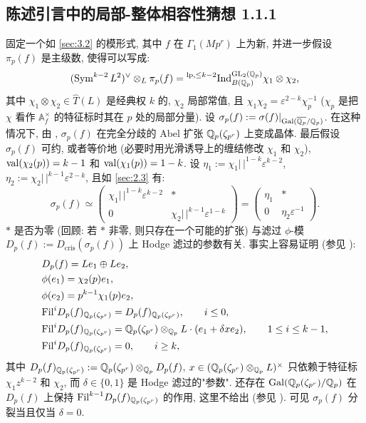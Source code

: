 
\subsection{陈述引言中的局部-整体相容性猜想 1.1.1}\label{sec:3.3}

固定一个如 \ref{sec:3.2} 的模形式, 其中 $f$ 在 $\Gamma_1(Mp^{r})$ 上为新, 并进一步假设 $\pi_p(f)$ 是主级数, 使得可以写成:
\[
(\operatorname{Sym}^{k-2}L^{2})^{\vee} \otimes_L \pi_p(f) = \prescript{\mathrm{lp},\le k-2}{}{\mathrm{Ind}}_{B(\mathbb{Q}_p)}^{\mathrm{GL}_2(\mathbb{Q}_p)} \chi_1 \otimes \chi_2,
\]
其中 $\chi_1 \otimes \chi_2 \in \widehat{T}(L)$ 是经典权 $k$ 的, $\chi_2$ 局部常值, 且 $\chi_1\chi_2 = \varepsilon^{2-k}\chi_p^{-1}$ ($\chi_p$ 是把 $\chi$ 看作 $\mathbb{A}_{f}^{\times}$ 的特征标时其在 $p$ 处的局部分量).
设 $\sigma_p(f) := \sigma(f)|_{\operatorname{Gal}(\overline{\mathbb{Q}_p}/\mathbb{Q}_p)}$.
在这种情况下, 由 \cite{ref:40}, $\sigma_p(f)$ 在完全分歧的 Abel 扩张 $\mathbb{Q}_p(\zeta_{p^{r}})$ 上变成晶体.
最后假设 $\sigma_p(f)$ 可约, 或者等价地 (必要时用光滑诱导上的缠结修改 $\chi_1$ 和 $\chi_2$), $\operatorname{val}(\chi_2(p)) = k-1$ 和 $\operatorname{val}(\chi_1(p)) = 1-k$.
设 $\eta_1 := \chi_1|\,|^{1-k}\varepsilon^{k-2}$, $\eta_2 := \chi_2|\,|^{k-1}\varepsilon^{2-k}$, 且如 \ref{sec:2.3} 有:
\[
\sigma_p(f) \simeq \begin{pmatrix} \chi_1|\,|^{1-k}\varepsilon^{k-2} & * \\ 0 & \chi_2|\,|^{k-1}\varepsilon^{1-k} \end{pmatrix} = \begin{pmatrix} \eta_1 & * \\ 0 & \eta_2\varepsilon^{-1} \end{pmatrix}.
\]
$*$ 是否为零 (回顾: 若 $*$ 非零, 则只存在一个可能的扩张) 与滤过 $\phi$-模 $D_p(f) := D_{\mathrm{cris}}(\sigma_p(f))$ 上 Hodge 滤过的参数有关.
事实上容易证明 (参见 \cite{ref:31}):
\[
\begin{aligned}
&D_p(f) = Le_1 \oplus Le_2,\\
&\phi(e_1) = \chi_2(p)e_1,\\
&\phi(e_2) = p^{k-1}\chi_1(p)e_2,\\
&\mathrm{Fil}^{i}D_p(f)_{\mathbb{Q}_p(\zeta_{p^{r}})} = D_p(f)_{\mathbb{Q}_p(\zeta_{p^{r}})}, \qquad i \le 0,\\
&\mathrm{Fil}^{i}D_p(f)_{\mathbb{Q}_p(\zeta_{p^{r}})} = \mathbb{Q}_p(\zeta_{p^{r}}) \otimes_{\mathbb{Q}_p} L \cdot (e_1 + \delta x e_2), \qquad 1 \le i \le k-1,\\
&\mathrm{Fil}^{i}D_p(f)_{\mathbb{Q}_p(\zeta_{p^{r}})} = 0, \qquad i \ge k,
\end{aligned}
\]
其中 $D_p(f)_{\mathbb{Q}_p(\zeta_{p^{r}})} := \mathbb{Q}_p(\zeta_{p^{r}}) \otimes_{\mathbb{Q}_p} D_p(f)$, $x \in (\mathbb{Q}_p(\zeta_{p^{r}}) \otimes_{\mathbb{Q}_p} L)^{\times}$ 只依赖于特征标 $\chi_1z^{k-2}$ 和 $\chi_2$, 而 $\delta \in \{0,1\}$ 是 Hodge 滤过的"参数".
还存在 $\operatorname{Gal}(\mathbb{Q}_p(\zeta_{p^{r}})/\mathbb{Q}_p)$ 在 $D_p(f)$ 上保持 $\mathrm{Fil}^{k-1}D_p(f)_{\mathbb{Q}_p(\zeta_{p^{r}})}$ 的作用, 这里不给出 (参见 \cite{ref:31}).
可见 $\sigma_p(f)$ 分裂当且仅当 $\delta = 0$.

